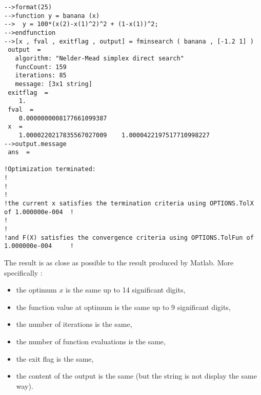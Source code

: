 \lstset{language=scilabscript}
\begin{lstlisting}
-->format(25)
-->function y = banana (x)
-->  y = 100*(x(2)-x(1)^2)^2 + (1-x(1))^2;
-->endfunction
-->[x , fval , exitflag , output] = fminsearch ( banana , [-1.2 1] )
 output  =
   algorithm: "Nelder-Mead simplex direct search"
   funcCount: 159
   iterations: 85
   message: [3x1 string]
 exitflag  =
    1.  
 fval  =
    0.0000000008177661099387  
 x  =
    1.0000220217835567027009    1.0000422197517710998227  
-->output.message
 ans  =
 
!Optimization terminated:                                                              !
!                                                                                      !
!the current x satisfies the termination criteria using OPTIONS.TolX of 1.000000e-004  !
!                                                                                      !
!and F(X) satisfies the convergence criteria using OPTIONS.TolFun of 1.000000e-004     !
\end{lstlisting}

The result is as close as possible to the result produced 
by Matlab. More specifically :
\begin{itemize}
\item the optimum $x$ is the same up to 14 significant digits,
\item the function value at optimum is the same up to 9 significant digits,
\item the number of iterations is the same,
\item the number of function evaluations is the same,
\item the exit flag is the same,
\item the content of the output is the same (but the string is not 
display the same way).
\end{itemize}



